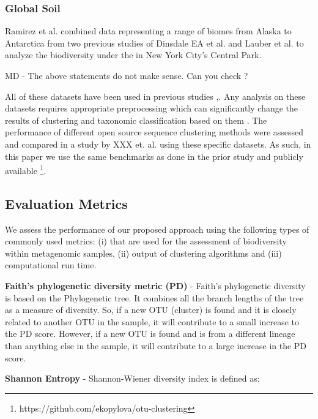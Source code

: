 \documentclass[10pt, conference, compsocconf]{IEEEtran}
\begin{document}
\subsubsection{Global Soil}
Ramirez et al.\cite{MARglobalSoil} combined data 
representing a range of biomes from Alaska to 
Antarctica from two previous studies of 
Dinsdale EA et al.\cite{MARnineBiomes} and 
Lauber et al.\cite{MARrestOfGlobalSoil} to analyze the 
 biodiversity under the  in New York City's Central Park.

MD - The above statements do not make sense. Can  you check ? 

All of these datasets have been used in 
previous studies \cite{MARmockDatasetRef},\cite{MARopenDeNovo}. Any 
analysis on these datasets requires 
appropriate preprocessing which can significantly change the 
results of clustering and taxonomic classification 
based on them \cite{MARmockDatasetRef}. The performance of 
different open source sequence clustering methods were 
assessed and compared in a  study by XXX et. al. \cite{MARopenDeNovo} using 
these specific datasets. As such, in this paper we use the same 
benchmarks as done in the prior study and publicly available \footnote{https://github.com/ekopylova/otu-clustering}.


\subsection{Evaluation Metrics}

We assess the performance of our proposed approach using 
the following types of  commonly used metrics: (i) that are used 
for the assessment of biodiversity
within metagenomic samples, (ii) output of clustering algorithms 
and (iii) computational run time. 

\hspace*{4mm}\textbf{Faith’s phylogenetic diversity metric (PD)} - Faith’s phylogenetic 
diversity \cite{MARfaith1992conservation} is based on the Phylogenetic tree. It combines all 
the branch lengths of the tree as a measure of diversity. So, if a new 
OTU (cluster)  is found and it is closely related to another OTU in the sample, it will contribute to 
a small increase to the PD score. However, if a new OTU is found and is 
from a different lineage than anything else in the sample, it will contribute to a large 
increase in the PD score. %

\hspace*{4mm}\textbf{Shannon Entropy} - Shannon-Wiener diversity index is defined as:
\end{document}
